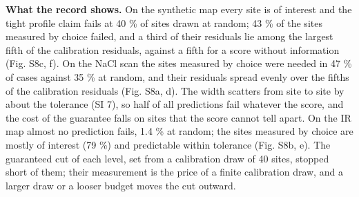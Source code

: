 \documentclass{iopjournal}
\begin{document}
\textbf{What the record shows.} On the synthetic map every site is of interest and the tight profile claim fails at 40 \% of sites drawn at random; 43 \% of the sites measured by choice failed, and a third of their residuals lie among the largest fifth of the calibration residuals, against a fifth for a score without information (Fig. S8c, f). On the NaCl scan the sites measured by choice were needed in 47 \% of cases against 35 \% at random, and their residuals spread evenly over the fifths of the calibration residuals (Fig. S8a, d). The width scatters from site to site by about the tolerance (SI 7), so half of all predictions fail whatever the score, and the cost of the guarantee falls on sites that the score cannot tell apart. On the IR map almost no prediction fails, 1.4 \% at random; the sites measured by choice are mostly of interest (79 \%) and predictable within tolerance (Fig. S8b, e). The guaranteed cut of each level, set from a calibration draw of 40 sites, stopped short of them; their measurement is the price of a finite calibration draw, and a larger draw or a looser budget moves the cut outward.
\end{document}
